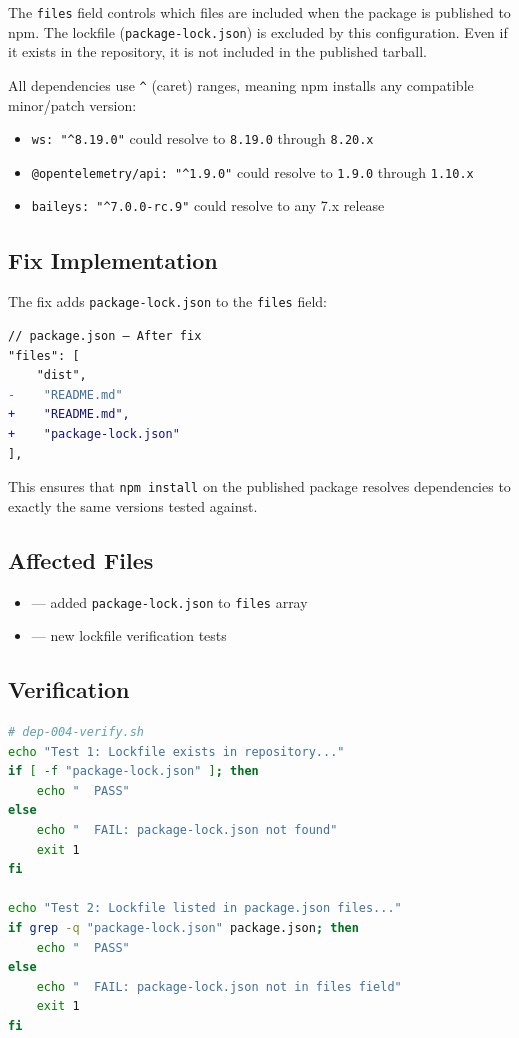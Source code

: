 The \texttt{files} field controls which files are included when the package is published to npm. The lockfile (\texttt{package-lock.json}) is excluded by this configuration. Even if it exists in the repository, it is not included in the published tarball.

All dependencies use \texttt{^} (caret) ranges, meaning npm installs any compatible minor/patch version:

\begin{itemize}
    \item \texttt{ws: "\^{}8.19.0"} could resolve to \texttt{8.19.0} through \texttt{8.20.x}
    \item \texttt{@opentelemetry/api: "\^{}1.9.0"} could resolve to \texttt{1.9.0} through \texttt{1.10.x}
    \item \texttt{baileys: "\^{}7.0.0-rc.9"} could resolve to any 7.x release
\end{itemize}

\subsection*{Fix Implementation}

The fix adds \texttt{package-lock.json} to the \texttt{files} field:

\begin{lstlisting}[language=diff]
// package.json — After fix
"files": [
    "dist",
-    "README.md"
+    "README.md",
+    "package-lock.json"
],
\end{lstlisting}

This ensures that \texttt{npm install} on the published package resolves dependencies to exactly the same versions tested against.

\subsection*{Affected Files}
\begin{itemize}
    \item {} --- added \texttt{package-lock.json} to \texttt{files} array
    \item {} --- new lockfile verification tests
\end{itemize}

\subsection*{Verification}
\begin{lstlisting}[language=bash]
# dep-004-verify.sh
echo "Test 1: Lockfile exists in repository..."
if [ -f "package-lock.json" ]; then
    echo "  PASS"
else
    echo "  FAIL: package-lock.json not found"
    exit 1
fi

echo "Test 2: Lockfile listed in package.json files..."
if grep -q "package-lock.json" package.json; then
    echo "  PASS"
else
    echo "  FAIL: package-lock.json not in files field"
    exit 1
fi
\end{lstlisting}

